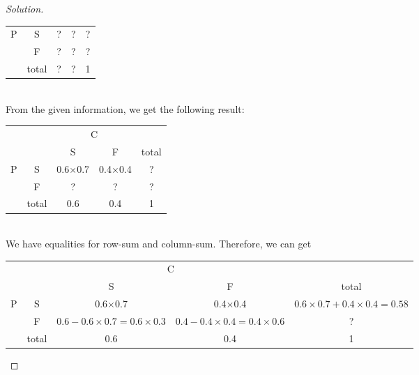 \begin{proof} [Solution]
\begin{itemize}
\begin{table}[htb!]
\begin{tabular}{ccccc}
						\multirow{2}{*}{P} & \multicolumn{1}{c|}{S}     & ? & \multicolumn{1}{c|}{?} & ?     \\
						& \multicolumn{1}{c|}{F}     & ? & \multicolumn{1}{c|}{?} & ?     \\ \cline{2-5} 
						& \multicolumn{1}{c|}{total} & ? & \multicolumn{1}{c|}{?} & 1    
					\end{tabular}
				\end{table}\\
				From the given information, we get the following result:
				\begin{table}[htb!]
					\setlength{\tabcolsep}{15pt}
					\renewcommand{\arraystretch}{2}
					\centering
					\begin{tabular}{ccccc}
						&                            & \multicolumn{2}{c}{C}      &       \\
						& \multicolumn{1}{c|}{}      & S & \multicolumn{1}{c|}{F} & total \\ \cline{2-5} 
						\multirow{2}{*}{P} & \multicolumn{1}{c|}{S}     & \color{red}0.6$\times$0.7 & \multicolumn{1}{c|}{\color{red}0.4$\times$0.4} & ?     \\
						& \multicolumn{1}{c|}{F}     & ? & \multicolumn{1}{c|}{?} & ?     \\ \cline{2-5} 
						& \multicolumn{1}{c|}{total} & \color{red}0.6 & \multicolumn{1}{c|}{\color{red}0.4} & 1    
					\end{tabular}
				\end{table}\\
				\newpage
				We have equalities for row-sum and column-sum. Therefore, we can get
				\begin{table}[htb!]
					\setlength{\tabcolsep}{8pt}
					\renewcommand{\arraystretch}{2}
					\centering
					\begin{tabular}{ccccc}
						&                            & \multicolumn{2}{c}{C}      &       \\
						& \multicolumn{1}{c|}{}      & S & \multicolumn{1}{c|}{F} & total \\ \cline{2-5} 
						\multirow{2}{*}{P} & \multicolumn{1}{c|}{S}     & 0.6$\times$0.7 & \multicolumn{1}{c|}{0.4$\times$0.4} & \color{red}$0.6\times0.7 + 0.4\times0.4 = 0.58$    \\
						& \multicolumn{1}{c|}{F}     & \color{red}$0.6 - 0.6\times0.7 = 0.6\times0.3$ & \multicolumn{1}{c|}{\color{red}$0.4 - 0.4\times0.4 = 0.4\times0.6$} & ?     \\ \cline{2-5} 
						& \multicolumn{1}{c|}{total} & 0.6 & \multicolumn{1}{c|}{0.4} & 1    

\end{tabular}
\end{table}
\end{itemize}
\end{proof}
